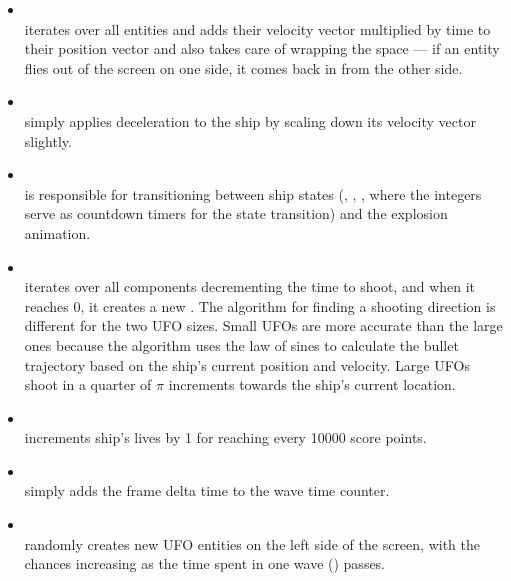 \documentclass[
  digital, %
  color,   %
  table,   %
  oneside, %
  lof,     %
  lot,     %
]{fithesis3}
\begin{document}
\begin{itemize}[\textendash]
    \item  {}\\
    iterates over all entities and adds their velocity vector multiplied
    by time  to their position vector and also takes care
    of wrapping the space --- if an entity flies out of the screen on one side,
    it comes back in from the other side.

    \item {}\\
    simply applies deceleration to the ship by scaling down its velocity vector slightly.

    \item {}\\
    is responsible for transitioning between ship states
    (, , ,
    where the integers serve as countdown timers for the state transition)
    and the explosion animation.

    \item {}\\
    iterates over all  components decrementing the time to
    shoot, and when it reaches 0, it creates a new .
    The algorithm for finding a shooting direction is different for the two UFO sizes.
    Small UFOs are more accurate than the large ones because the algorithm uses
    the law of sines to calculate the bullet trajectory based on the ship's current
    position and velocity. Large UFOs shoot in a quarter of $\pi$ increments
    towards the ship's current location.

    \item {}\\
    increments ship's lives by 1 for reaching every 10000 score points.

    \item {}\\
    simply adds the frame delta time  to the wave time counter.

    \item {}\\
    randomly creates new UFO entities on the left side of the screen,
    with the chances increasing as the time spent in one wave () passes.


\end{itemize}
\end{document}
